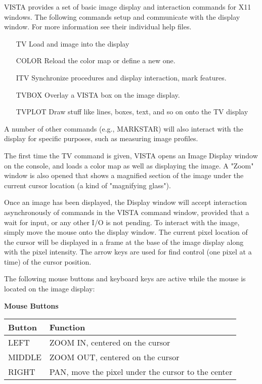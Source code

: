 VISTA provides a set of basic image display and interaction commands for
X11 windows.  The following commands setup and communicate with the display
window.  For more information see their individual help files.
\begin{itemize} 
  \item[TV\hfill]{Load and image into the display}
  \item[COLOR\hfill]{Reload the color map or define a new one.}
  \item[ITV\hfill]{Synchronize procedures and display interaction, mark
       features.}
  \item[TVBOX\hfill]{Overlay a VISTA box on the image display.}
  \item[TVPLOT \hfill]{Draw stuff like lines, boxes, text, and so on onto the 
       TV display}
\end{itemize} 
A number of other commands (e.g., MARKSTAR) will also interact with the
display for specific purposes, such as measuring image profiles.

The first time the TV command is given, VISTA opens an Image Display
window on the console, and loads a color map as well as displaying the
image. A "Zoom" window is also opened that shows a magnified section of
the image under the current cursor location (a kind of "magnifying
glass").
 
Once an image has been displayed, the Display window will accept
interaction asynchronously of commands in the VISTA command window,
provided that a wait for input, or any other I/O is not pending.  To
interact with the image, simply move the mouse onto the display window.
The current pixel location of the cursor will be displayed in a frame at
the base of the image display along with the pixel intensity.  The arrow
keys are used for find control (one pixel at a time) of the cursor
position.
 
The following mouse buttons and keyboard keys are active while the mouse
is located on the image display:
 
\begin{center}
{\bf Mouse Buttons}\\
\begin{tabular}{ll}
\hline
Button & Function\\
\hline
LEFT  &ZOOM IN, centered on the cursor\\
MIDDLE&ZOOM OUT, centered on the cursor\\
RIGHT &PAN, move the pixel under the cursor to the center\\
\hline
\end{tabular}
\end{center}
 
